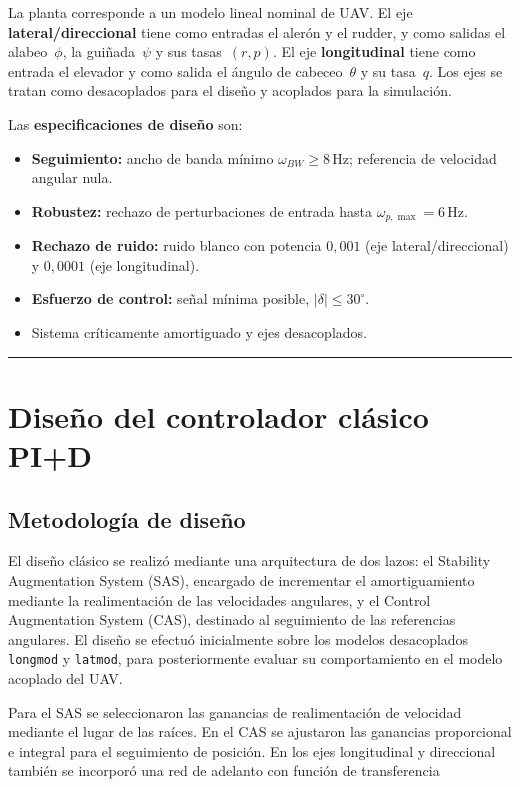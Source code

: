 \documentclass[11pt,letterpaper]{article}
\numberwithin{equation}{section}
\begin{document}
La planta corresponde a un modelo lineal nominal de UAV. El eje \textbf{lateral/direccional} tiene como entradas el aler\'on y el rudder, y como salidas el alabeo~$\phi$, la gui\~nada~$\psi$ y sus tasas~$(r,p)$. El eje \textbf{longitudinal} tiene como entrada el elevador y como salida el \'angulo de cabeceo~$\theta$ y su tasa~$q$. Los ejes se tratan como desacoplados para el dise\~no y acoplados para la simulaci\'on.

Las \textbf{especificaciones de dise\~no} son:
\begin{itemize}[leftmargin=*,noitemsep]
  \item \textbf{Seguimiento:} ancho de banda m\'inimo $\omega_{BW} \geq 8\,\text{Hz}$; referencia de velocidad angular nula.
  \item \textbf{Robustez:} rechazo de perturbaciones de entrada hasta $\omega_{p,\max} = 6\,\text{Hz}$.
  \item \textbf{Rechazo de ruido:} ruido blanco con potencia $0{,}001$ (eje lateral/direccional) y $0{,}0001$ (eje longitudinal).
  \item \textbf{Esfuerzo de control:} se\~nal m\'inima posible, $|\delta| \leq 30^\circ$.
  \item Sistema cr\'iticamente amortiguado y ejes desacoplados.
\end{itemize}

\vspace{0.2cm}
\hrule
\vspace{0.3cm}

\section{Diseño del controlador clásico PI+D}

\subsection{Metodología de diseño}

El diseño clásico se realizó mediante una arquitectura de dos
lazos: el Stability Augmentation System (SAS), encargado de
incrementar el amortiguamiento mediante la realimentación de las
velocidades angulares, y el Control Augmentation System (CAS),
destinado al seguimiento de las referencias angulares. El diseño
se efectuó inicialmente sobre los modelos desacoplados
\texttt{longmod} y \texttt{latmod}, para posteriormente evaluar
su comportamiento en el modelo acoplado del UAV.

Para el SAS se seleccionaron las ganancias de realimentación de
velocidad mediante el lugar de las raíces. En el CAS se ajustaron
las ganancias proporcional e integral para el seguimiento de
posición. En los ejes longitudinal y direccional también se
incorporó una red de adelanto con función de transferencia
\end{document}
